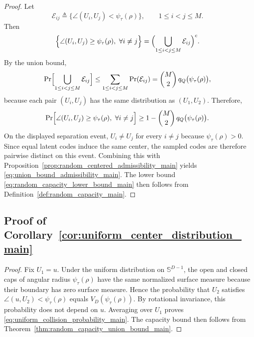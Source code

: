 \documentclass[journal]{IEEEtran}
\begin{document}
\begin{bibunit}
\begin{proof}
%
Let
\begin{equation}
\mathcal E_{ij}\triangleq \{\angle(U_i,U_j)<\psi_\tau(\rho)\}, \qquad 1\le i<j\le M.
\end{equation}
%
Then
%
\begin{equation}
\Bigl\{ \angle(U_i,U_j)\ge \psi_\tau(\rho),\ \forall i\neq j \Bigr\}
= \Bigl( \bigcup_{1\le i<j\le M}\mathcal E_{ij} \Bigr)^c.
\end{equation}
%
By the union bound,
%
\begin{equation}
\Pr \Bigl[ \bigcup_{1\le i<j\le M}\mathcal E_{ij} \Bigr]
\le \sum_{1\le i<j\le M}\Pr(\mathcal E_{ij})
= \binom{M}{2}\,q_Q \bigl(\psi_\tau(\rho)\bigr),
\end{equation}
%
because each pair $(U_i,U_j)$ has the same distribution as $(U_1,U_2)$. Therefore,
%
\begin{equation}
\Pr \Bigl[ \angle(U_i,U_j)\ge \psi_\tau(\rho),\ \forall i\neq j \Bigr]
\ge 1-\binom{M}{2}\,q_Q \bigl(\psi_\tau(\rho)\bigr).
\end{equation}
%
On the displayed separation event, $U_i\ne U_j$ for every $i\ne j$ because $\psi_\tau(\rho)>0$. Since equal latent codes induce the same center, the sampled codes are therefore pairwise distinct on this event. Combining this with Proposition~\ref{prop:random_centered_admissibility_main} yields \eqref{eq:union_bound_admissibility_main}. The lower bound \eqref{eq:random_capacity_lower_bound_main} then follows from Definition~\ref{def:random_capacity_main}.
%
\end{proof}




\subsection{Proof of Corollary~\ref{cor:uniform_center_distribution_main}}
\label{app:proof_cor_uniform_center_distribution}


\begin{proof}
%
Fix $U_1=u$. Under the uniform distribution on $\mathbb S^{D-1}$, the open and closed caps of angular radius $\psi_\tau(\rho)$ have the same normalized surface measure because their boundary has zero surface measure. Hence the probability that $U_2$ satisfies $\angle(u,U_2)<\psi_\tau(\rho)$ equals $V_D(\psi_\tau(\rho))$. By rotational invariance, this probability does not depend on $u$. Averaging over $U_1$ proves \eqref{eq:uniform_collision_probability_main}. The capacity bound then follows from Theorem~\ref{thm:random_capacity_union_bound_main}.
%
\end{proof}









\end{bibunit}
\end{document}
